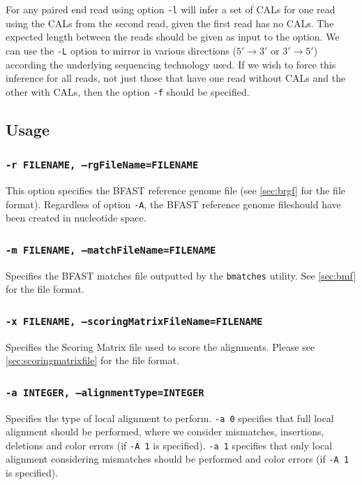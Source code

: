 \documentclass[a4paper,12pt]{book}
\newcommand{\TT}[1]{{\tt #1}} %
\newcommand{\BRGF}{BFAST reference genome file} %
\newcommand{\BMF}{BFAST matches file} %
\begin{document}
For any paired end read using option \TT{-l} will infer a set of CALs for one read using the CALs from the second read, given the first read has no CALs.
The expected length between the reads should be given as input to the option.
We can use the \TT{-L} option to mirror in various directions ($5'\rightarrow 3'$ or $3'\rightarrow 5'$) according the underlying sequencing technology used. 
If we wish to force this inference for all reads, not just those that have one read without CALs and the other with CALs, then the option \TT{-f} should be specified.

\subsection{Usage}
\subsubsection{\TT{-r FILENAME, --rgFileName=FILENAME}}
This option specifies the \BRGF{} (see \autoref{sec:brgf} for the file format).
Regardless of option \TT{-A}, the \BRGF should have been created in nucleotide space.

\subsubsection{\TT{-m FILENAME, --matchFileName=FILENAME}}
Specifies the \BMF{} outputted by the \TT{bmatches} utility.
See \autoref{sec:bmf} for the file format.

\subsubsection{\TT{-x FILENAME, --scoringMatrixFileName=FILENAME}}
Specifies the Scoring Matrix file used to score the alignments.
Please see \autoref{sec:scoringmatrixfile} for the file format.

\subsubsection{\TT{-a INTEGER, --alignmentType=INTEGER}}
Specifies the type of local alignment to perform.
\TT{-a 0} specifies that full local alignment should be performed, where we consider mismatches, insertions, deletions and color errors (if \TT{-A 1} is specified).
\TT{-a 1} specifies that only local alignment considering mismatches should be performed and color errors (if \TT{-A 1} is specified).
%
\end{document}
